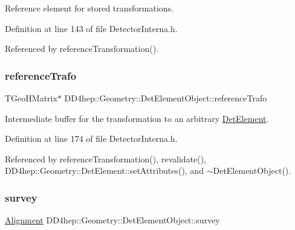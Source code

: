 Reference element for stored transformations. 



Definition at line 143 of file Detector\+Interna.\+h.



Referenced by reference\+Transformation().

\hypertarget{class_d_d4hep_1_1_geometry_1_1_det_element_object_af2931f218ee37465cdc62733306d15f3}{}\label{class_d_d4hep_1_1_geometry_1_1_det_element_object_af2931f218ee37465cdc62733306d15f3} 
\subsubsection{\texorpdfstring{reference\+Trafo}{referenceTrafo}}
{\footnotesize\ttfamily T\+Geo\+H\+Matrix$\ast$ D\+D4hep\+::\+Geometry\+::\+Det\+Element\+Object\+::reference\+Trafo}



Intermediate buffer for the transformation to an arbitrary \hyperlink{class_d_d4hep_1_1_geometry_1_1_det_element}{Det\+Element}. 



Definition at line 174 of file Detector\+Interna.\+h.



Referenced by reference\+Transformation(), revalidate(), D\+D4hep\+::\+Geometry\+::\+Det\+Element\+::set\+Attributes(), and $\sim$\+Det\+Element\+Object().

\hypertarget{class_d_d4hep_1_1_geometry_1_1_det_element_object_ae01bd959a10eeb236ab0f21d7241a3a1}{}\label{class_d_d4hep_1_1_geometry_1_1_det_element_object_ae01bd959a10eeb236ab0f21d7241a3a1} 
\subsubsection{\texorpdfstring{survey}{survey}}
{\footnotesize\ttfamily \hyperlink{class_d_d4hep_1_1_geometry_1_1_det_element_object_aaf1bb49d0e1799f548f775b35e3cb590}{Alignment} D\+D4hep\+::\+Geometry\+::\+Det\+Element\+Object\+::survey}




